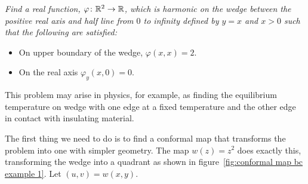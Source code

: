 \documentclass{article}
\begin{document}
    \begin{example}
        \itshape
        Find a real function, \(\varphi\colon\mathbb{R}^2 \to \mathbb{R}\), which is harmonic on the wedge between the positive real axis and half line from \(0\) to infinity defined by \(y = x\) and \(x > 0\) such that the following are satisfied:
        \begin{itemize}
            \item On upper boundary of the wedge, \(\varphi(x, x) = 2\).
            \item On the real axis \(\varphi_y(x, 0) = 0\).
        \end{itemize}
        This problem may arise in physics, for example, as finding the equilibrium temperature on wedge with one edge at a fixed temperature and the other edge in contact with insulating material.
        
        \normalfont
        The first thing we need to do is to find a conformal map that transforms the problem into one with simpler geometry.
        The map \(w(z) = z^2\) does exactly this, transforming the wedge into a quadrant as shown in figure~\ref{fig:conformal map bc example 1}.
        Let \((u, v) = w(x, y)\).
        \begin{figure}[ht]
            \centering
            \tikzexternalenable
\end{figure}
\end{example}
\end{document}
